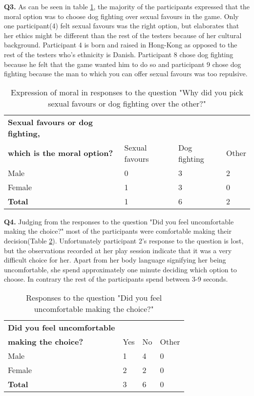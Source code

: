 \textbf{Q3.}  As can be seen in table \ref{tab:choice}, the majority of the participants expressed that the moral option was to choose dog fighting over sexual favours in the game. Only one participant(4) felt sexual favours was the right option, but elaborates that her ethics might be different than the rest of the testers because of her cultural background. Participant 4 is born and raised in Hong-Kong as opposed to the rest of the testers who's ethnicity is Danish. Participant 8 chose dog fighting because he felt that the game wanted him to do so and participant 9 chose dog fighting because the man to which you can offer sexual favours was too repulsive.

\begin{table}[h]
\centering
\begin{tabular}{l l l l}
\hline
\textbf{Sexual favours or dog fighting,}\\
\textbf{which is the moral option?} & Sexual favours & Dog fighting & Other \\
\hline
Male & 0 & 3 & 2 \\
Female & 1 & 3 & 0 \\
\textbf{Total} & 1 & 6 & 2 \\
\hline
\end{tabular}
\caption{\label{tab:choice}Expression of moral in responses to the question "Why did you pick sexual favours or dog fighting over the other?"}
\end{table}

\textbf{Q4.} Judging from the responses to the question "Did you feel uncomfortable making the choice?" most of the participants were comfortable making their decision(Table \ref{tab:unco}). Unfortunately participant 2's response to the question is lost, but the observations recorded at her play session indicate that it was a very difficult choice for her. Apart from her body language signifying her being uncomfortable, she spend approximately one minute deciding which option to choose. In contrary the rest of the participants spend between 3-9 seconds. 

\begin{table}[h]
\centering
\begin{tabular}{l l l l}
\hline
\textbf{Did you feel uncomfortable}\\
\textbf{making the choice?} & Yes & No & Other \\
\hline
Male & 1 & 4 & 0 \\
Female & 2 & 2 & 0 \\
\textbf{Total} & 3 & 6 & 0 \\
\hline
\end{tabular}
\caption{\label{tab:unco}Responses to the question "Did you feel uncomfortable making the choice?"}
\end{table}


